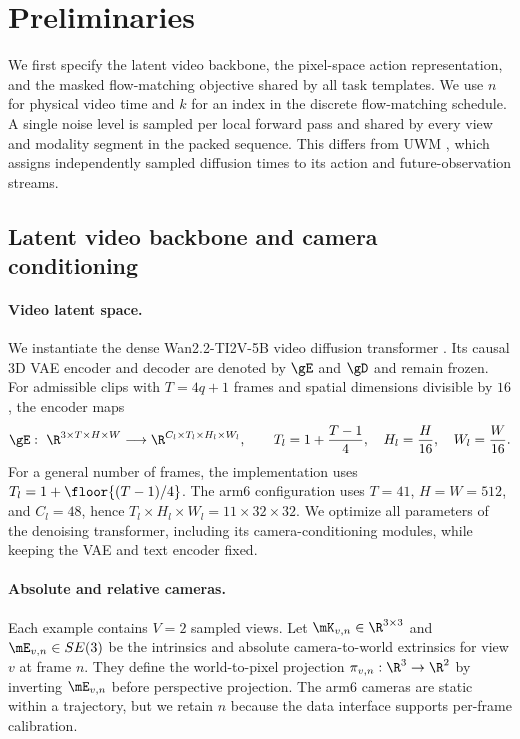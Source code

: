 
\section{Preliminaries}
\label{sec:prelim}

We first specify the latent video backbone, the pixel-space action representation, and the
masked flow-matching objective shared by all task templates. We use $n$ for physical video time
and $k$ for an index in the discrete flow-matching schedule. A single noise level is sampled per
local forward pass and shared by every view and modality segment in the packed sequence. This
differs from UWM \citep{zhu2025unified}, which assigns independently sampled diffusion times to
its action and future-observation streams.

\subsection{Latent video backbone and camera conditioning}
\label{sec:prelim-backbone}

\paragraph{Video latent space.}
We instantiate the dense Wan2.2-TI2V-5B video diffusion transformer
\citep{wan2025,wan2025wan22}. Its causal 3D VAE encoder and decoder are denoted by $\gE$ and
$\gD$ and remain frozen. For admissible clips with $T=4q+1$ frames and spatial dimensions
divisible by $16$, the encoder maps
\begin{equation}
    \gE:\ \R^{3\times T\times H\times W}
    \longrightarrow
    \R^{C_l\times T_l\times H_l\times W_l},
    \qquad
    T_l=1+\frac{T-1}{4},\quad
    H_l=\frac{H}{16},\quad
    W_l=\frac{W}{16}.
    \label{eq:prelim-vae}
\end{equation}
For a general number of frames, the implementation uses
$T_l=1+\floor{(T-1)/4}$. The arm6 configuration uses $T=41$, $H=W=512$, and $C_l=48$, hence
$T_l\times H_l\times W_l=11\times32\times32$. We optimize all parameters of the denoising
transformer, including its camera-conditioning modules, while keeping the VAE and text encoder
fixed.

\paragraph{Absolute and relative cameras.}
Each example contains $V=2$ sampled views. Let
$\mK_{v,n}\in\R^{3\times3}$ and $\mE_{v,n}\in SE(3)$ be the intrinsics and absolute
camera-to-world extrinsics for view $v$ at frame $n$. They define the world-to-pixel projection
$\pi_{v,n}:\R^3\to\R^2$ by inverting $\mE_{v,n}$ before perspective projection. The arm6 cameras
are static within a trajectory, but we retain $n$ because the data interface supports per-frame
calibration.

